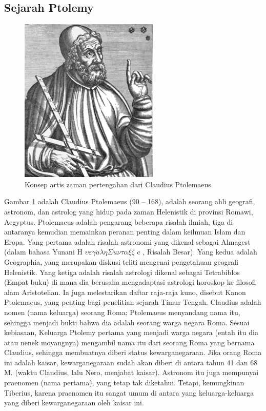 \subsection{Sejarah Ptolemy}
	\begin{figure} [ht]
	\centerline{\includegraphics[width=.5\textwidth]{figures/Ptolemyporg}}
	\caption{Konsep artis zaman pertengahan dari Claudius Ptolemaeus.}
	\label{Ptolemyporg}
	\end{figure}
    Gambar \ref{Ptolemyporg} adalah Claudius Ptolemaeus (90 – 168), adalah seorang ahli geografi, astronom, dan astrolog yang hidup pada zaman Helenistik di provinsi Romawi, Aegyptus.
    Ptolemaeus adalah pengarang beberapa risalah ilmiah, tiga di antaranya kemudian memainkan peranan penting dalam keilmuan Islam dan Eropa. Yang pertama adalah risalah astronomi yang dikenal sebagai Almagest (dalam bahasa Yunani H $\displaystyle \upsilon \varepsilon \gamma \acute{a}\lambda \eta \Sigma \acute{u} \nu \tau \alpha \xi \zeta$ c , Risalah Besar). Yang kedua adalah Geographia, yang merupakan diskusi teliti mengenai pengetahuan geografi Helenistik. Yang ketiga adalah risalah astrologi dikenal sebagai Tetrabiblos (Empat buku) di mana dia berusaha mengadaptasi astrologi horoskop ke filosofi alam Aristotelian. Ia juga melestarikan daftar raja-raja kuno, disebut Kanon Ptolemaeus, yang penting bagi penelitian sejarah Timur Tengah.
    Claudius adalah nomen (nama keluarga) seorang Roma; Ptolemaeus menyandang nama itu, sehingga menjadi bukti bahwa dia adalah seorang warga negara Roma. Sesuai kebiasaan, Keluarga Ptolemy pertama yang menjadi warga negara (entah itu dia atau nenek moyangnya) mengambil nama itu dari seorang Roma yang bernama Claudius, sehingga membuatnya diberi status kewarganegaraan. Jika orang Roma ini adalah kaisar, kewarganegaraan sudah akan diberi di antara tahun 41 dan 68 M. (waktu Claudius, lalu Nero, menjabat kaisar). Astronom itu juga mempunyai praenomen (nama pertama), yang tetap tak diketahui. Tetapi, kemungkinan Tiberius, karena praenomen itu sangat umum di antara yang keluarga-keluarga yang diberi kewarganegaraan oleh kaisar ini.
